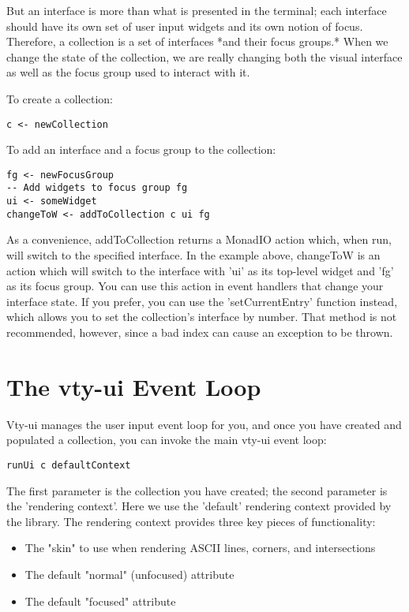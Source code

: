 \documentclass[11pt, letterpaper, oneside, titlepage]{article}
\begin{document}
But an interface is more than what is presented in the terminal; each
interface should have its own set of user input widgets and its own
notion of focus.  Therefore, a collection is a set of interfaces *and
their focus groups.*  When we change the state of the collection, we are
really changing both the visual interface as well as the focus group
used to interact with it.

To create a collection:

\begin{verbatim}
c <- newCollection
\end{verbatim}

To add an interface and a focus group to the collection:

\begin{verbatim}
fg <- newFocusGroup
-- Add widgets to focus group fg
ui <- someWidget
changeToW <- addToCollection c ui fg
\end{verbatim}

As a convenience, addToCollection returns a MonadIO action which, when
run, will switch to the specified interface.  In the example above,
changeToW is an action which will switch to the interface with 'ui' as
its top-level widget and 'fg' as its focus group.  You can use this
action in event handlers that change your interface state.  If you
prefer, you can use the 'setCurrentEntry' function instead, which
allows you to set the collection's interface by number.  That method
is not recommended, however, since a bad index can cause an exception
to be thrown.

\section{The vty-ui Event Loop}

Vty-ui manages the user input event loop for you, and once you have
created and populated a collection, you can invoke the main vty-ui event
loop:

\begin{verbatim}
runUi c defaultContext
\end{verbatim}

The first parameter is the collection you have created; the second
parameter is the 'rendering context'.  Here we use the 'default'
rendering context provided by the library.  The rendering context
provides three key pieces of functionality:

\begin{itemize}
\item The "skin" to use when rendering ASCII lines, corners, and
      intersections
\item The default "normal" (unfocused) attribute
\item The default "focused" attribute
\end{itemize}
\end{document}
